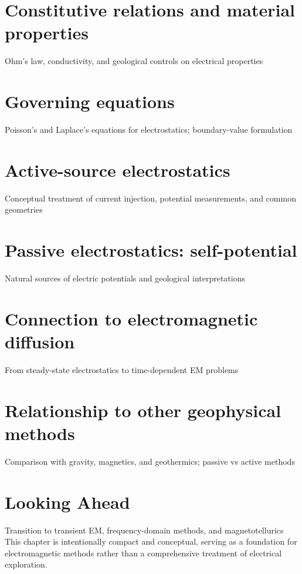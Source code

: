 \section{Constitutive relations and material properties}
Ohm's law, conductivity, and geological controls on electrical properties

\section{Governing equations}
Poisson's and Laplace's equations for electrostatics; boundary-value formulation

\section{Active-source electrostatics}
Conceptual treatment of current injection, potential measurements, and common geometries

\section{Passive electrostatics: self-potential}
Natural sources of electric potentials and geological interpretations

\section{Connection to electromagnetic diffusion}
From steady-state electrostatics to time-dependent EM problems

\section{Relationship to other geophysical methods}
Comparison with gravity, magnetics, and geothermics; passive vs active methods

\section{Looking Ahead}
Transition to transient EM, frequency-domain methods, and magnetotellurics
This chapter is intentionally compact and conceptual, serving as a foundation for electromagnetic methods rather than a comprehensive treatment of electrical exploration.